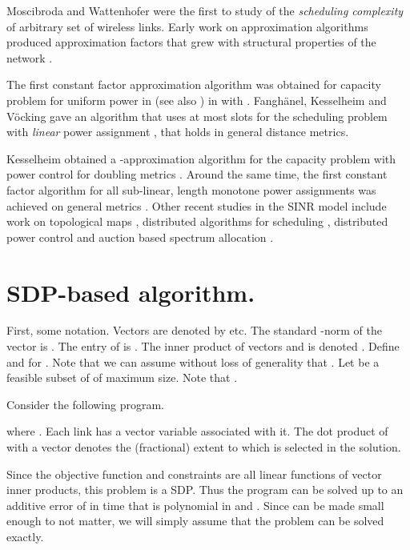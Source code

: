 \documentclass[11pt]{amsart}
\begin{document}
Moscibroda and Wattenhofer \cite{MoWa06} were the first to
study of the \emph{scheduling complexity} of arbitrary set
of wireless links. 
Early work on approximation algorithms
 produced approximation
factors that grew with structural properties of the network \cite{moscibroda06b,MoscibrodaOW07,chafekar07}.


The first constant factor approximation algorithm was obtained for
capacity problem for uniform power in \cite{GHWW09} (see also
\cite{HW09}) in  with .
Fangh\"anel, Kesselheim and V\"ocking \cite{FKV09} gave an algorithm
that uses at most  slots for the scheduling problem
with \emph{linear} power assignment ,
that holds in general distance metrics.


Kesselheim obtained 
a -approximation algorithm
for the capacity problem with power control for doubling metrics \cite{KesselheimSoda11}. Around the same time,
the first constant factor algorithm for all sub-linear, length monotone power assignments
was achieved on general metrics \cite{SODA11}. Other recent studies in the SINR model
include work on topological maps \cite{stoc_topology11}, distributed algorithms for scheduling \cite{icalp11},
distributed power control \cite{damsicalp11} and auction based spectrum allocation \cite{hoeferspaa11}.







\section{SDP-based algorithm.}

First, some notation. Vectors are denoted by  etc. The standard -norm of the vector  is . The 
entry of  is .
The inner product of vectors  and  is denoted . Define  and  for . 
Note that we can assume without loss of generality that .
Let  be a feasible subset of 
of maximum size. Note that .

Consider the following program.


where . Each link  has a vector variable  associated
with it. The dot product of  with a vector  denotes  the (fractional) extent to which  is
selected in the solution. 

Since the objective function and constraints are all linear functions of vector inner products, this
problem is a SDP. Thus the program can be solved up to an additive error of  in time that is polynomial in 
 and  \cite{Vandenberghe94semidefiniteprogramming}. Since  can be made small enough to not matter, we will simply
assume that the problem can be solved exactly.
\end{document}

